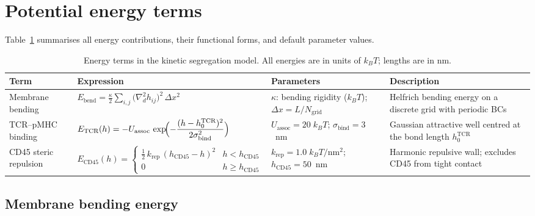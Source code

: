 \documentclass[11pt,a4paper]{article}
\begin{document}
\section{Potential energy terms}
\label{sec:potentials}

Table~\ref{tab:potentials} summarises all energy contributions, their
functional forms, and default parameter values.

\begin{table}[ht]
  \centering
  \caption{Energy terms in the kinetic segregation model.  All
    energies are in units of $k_BT$; lengths are in nm.}
  \label{tab:potentials}
  \small
  \begin{tabular}{@{}p{2.8cm}p{5.2cm}p{3.5cm}p{3.5cm}@{}}
    \toprule
    \textbf{Term} & \textbf{Expression} & \textbf{Parameters} &
      \textbf{Description} \\
    \midrule
    Membrane bending &
      $\displaystyle E_\text{bend}
        = \frac{\kappa}{2}\sum_{i,j}
          \bigl(\nabla^2_d h_{ij}\bigr)^2\,\Delta x^2$ &
      $\kappa$: bending rigidity ($k_BT$); \newline
      $\Delta x = L/N_\text{grid}$ &
      Helfrich bending energy on a discrete grid with periodic BCs \\[6pt]
    TCR--pMHC binding &
      $\displaystyle E_\text{TCR}(h)
        = -U_\text{assoc}\,
          \exp\!\Bigl(-\frac{(h-h_0^\text{TCR})^2}{2\sigma_\text{bind}^2}\Bigr)$ &
      $U_\text{assoc}=20\;k_BT$; \newline
      $\sigma_\text{bind}=3$~nm &
      Gaussian attractive well centred at the bond length $h_0^\text{TCR}$ \\[6pt]
    CD45 steric repulsion &
      $\displaystyle E_\text{CD45}(h)
        = \begin{cases}
            \tfrac{1}{2}\,k_\text{rep}\,(h_\text{CD45}-h)^2
              & h < h_\text{CD45} \\
            0 & h \ge h_\text{CD45}
          \end{cases}$ &
      $k_\text{rep}=1.0\;k_BT/\text{nm}^2$; \newline
      $h_\text{CD45}=50$~nm &
      Harmonic repulsive wall; excludes CD45 from tight contact \\
    \bottomrule
  \end{tabular}
\end{table}


\subsection{Membrane bending energy}
\end{document}
